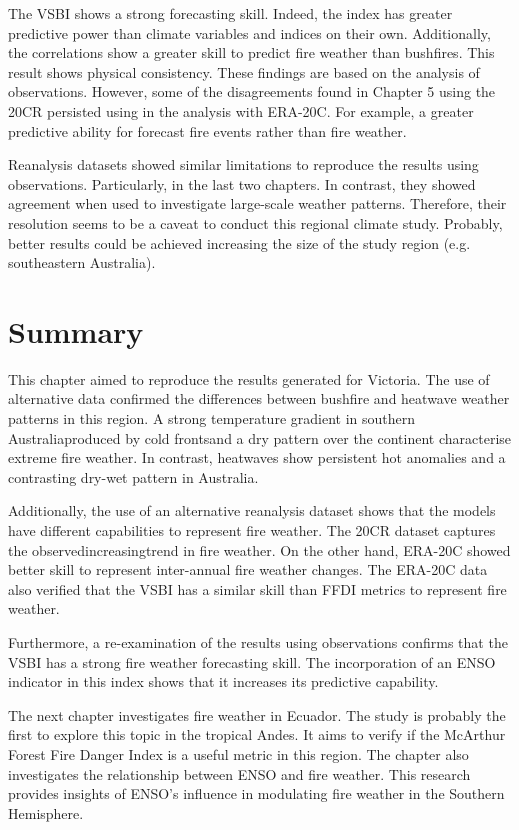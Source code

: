 The VSBI shows a strong forecasting skill. Indeed, the index has greater
predictive power than climate variables and indices on their own.
Additionally, the correlations show a greater skill to predict fire
weather than bushfires. This result shows physical consistency. These
findings are based on the analysis of observations. However, some
of the disagreements found in Chapter 5 using the 20CR persisted using
in the analysis with ERA-20C. For example, a greater predictive ability
for forecast fire events rather than fire weather. 

Reanalysis datasets showed similar limitations to reproduce the results
using observations. Particularly, in the last two chapters. In contrast,
they showed agreement when used to investigate large-scale weather
patterns. Therefore, their resolution seems to be a caveat to conduct
this regional climate study. Probably, better results could be achieved
increasing the size of the study region (e.g. southeastern Australia).


\section{Summary}

This chapter aimed to reproduce the results generated for Victoria.
The use of alternative data confirmed the differences between bushfire
and heatwave weather patterns in this region. A strong temperature
gradient in southern Australia\textemdash produced by cold fronts\textemdash and
a dry pattern over the continent characterise extreme fire weather.
In contrast, heatwaves show persistent hot anomalies and a contrasting
dry-wet pattern in Australia. 

Additionally, the use of an alternative reanalysis dataset shows that
the models have different capabilities to represent fire weather.
The 20CR dataset captures the observed\textemdash increasing\textemdash trend
in fire weather. On the other hand, ERA-20C showed better skill to
represent inter-annual fire weather changes. The ERA-20C data also
verified that the VSBI has a similar skill than FFDI metrics to represent
fire weather. 

Furthermore, a re-examination of the results using observations confirms
that the VSBI has a strong fire weather forecasting skill. The incorporation
of an ENSO indicator in this index shows that it increases its predictive
capability. 

The next chapter investigates fire weather in Ecuador. The study is
probably the first to explore this topic in the tropical Andes. It
aims to verify if the McArthur Forest Fire Danger Index is a useful
metric in this region. The chapter also investigates the relationship
between ENSO and fire weather. This research provides insights of
ENSO's influence in modulating fire weather in the Southern Hemisphere. 

